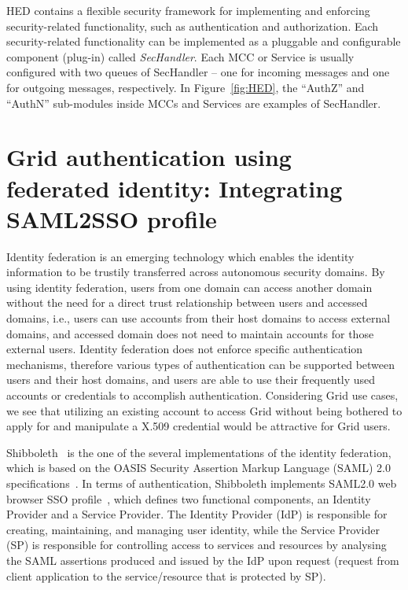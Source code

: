 \documentclass[conference]{IEEEtran}
\begin{document}
HED contains a flexible security framework for implementing and enforcing
security-related functionality, such as authentication and authorization. 
Each security-related functionality can be implemented as a pluggable and
configurable component (plug-in) called \textit{SecHandler}. Each MCC or Service is usually
configured with two queues of SecHandler -- one for incoming messages and one for
outgoing messages, respectively. In Figure~\ref{fig:HED}, the ``AuthZ'' and ``AuthN'' sub-modules
inside MCCs and Services are examples of SecHandler.

\section{Grid authentication using federated identity: Integrating SAML2SSO
profile}
\label{sec:intergrationSAML2SSO}
Identity federation is an emerging technology which enables the identity
information to be trustily transferred across autonomous security domains. By using identity
federation, users from one domain can access another domain without the need for a direct trust
relationship between users and accessed domains, i.e., users can use accounts from their host
domains to access external domains, and accessed domain does not need to maintain accounts
for those external users. Identity federation does not enforce specific authentication
mechanisms, therefore various types of authentication can be supported
between users and their host domains, and users are able to use their frequently used accounts or credentials to
accomplish authentication. Considering Grid use cases, we see that utilizing an existing account to
access Grid without being bothered to apply for and manipulate a X.509 credential
would be attractive for Grid users.

Shibboleth~\cite{Shiblink} is the one of the several implementations of the
identity federation, which is based on the OASIS Security Assertion Markup Language (SAML) 2.0
specifications~\cite{SAMLlink}. In terms of authentication, Shibboleth implements SAML2.0 web browser SSO
profile~\cite{SAMLprofiles}, which  defines two functional components, an Identity Provider and a Service Provider. The
Identity Provider (IdP) is responsible for creating, maintaining, and managing user identity,
while the Service Provider (SP) is responsible for controlling access to services and resources by
analysing the SAML assertions produced and issued by the IdP upon request (request from
client application to the service/resource that is protected by SP).
\end{document}
